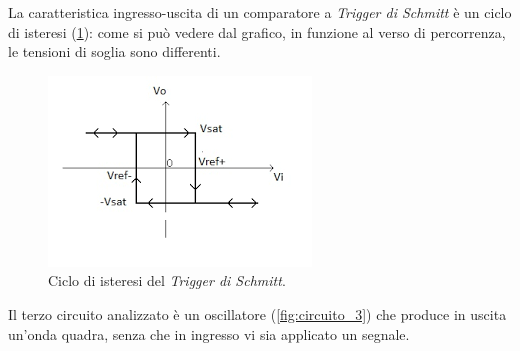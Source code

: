 \noindent
La caratteristica ingresso-uscita di un comparatore a \textit{Trigger di Schmitt} è un ciclo di isteresi (\Fig\ref{fig:ciclo_isteresi}): come si può vedere dal grafico, in funzione al verso di percorrenza, le tensioni di soglia sono differenti. 
\begin{figure}[h!]
	\centering
	\includegraphics[width=0.8\linewidth]{./ImageFiles/Laboratorio 3/Ciclo di Isteresi.png}
	\caption{Ciclo di isteresi del \textit{Trigger di Schmitt}.}
	\label{fig:ciclo_isteresi}
\end{figure} 


\clearpage
Il terzo circuito analizzato è un oscillatore (\Fig\ref{fig:circuito_3}) che produce in uscita un'onda quadra, senza che in ingresso vi sia applicato un segnale.

